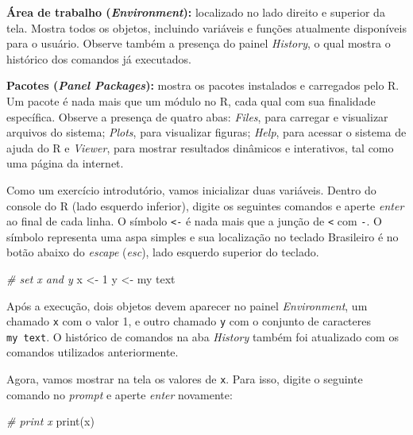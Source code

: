 \documentclass[
  11pt,
]{book}
\newenvironment{Shaded}{\begin{snugshade}}{\end{snugshade}}
\newcommand{\CommentTok}[1]{\textcolor[rgb]{0.37,0.37,0.37}{\textit{#1}}}
\newcommand{\DecValTok}[1]{\textcolor[rgb]{0.06,0.06,0.06}{#1}}
\newcommand{\FunctionTok}[1]{\textcolor[rgb]{0,0,0}{#1}}
\newcommand{\NormalTok}[1]{#1}
\newcommand{\OtherTok}[1]{\textcolor[rgb]{0.37,0.37,0.37}{#1}}
\newcommand{\StringTok}[1]{\textcolor[rgb]{0.5,0.5,0.5}{#1}}
\begin{document}
\textbf{Área de trabalho (\emph{Environment}):} localizado no lado direito e superior da tela. Mostra todos os objetos, incluindo variáveis e funções atualmente disponíveis para o usuário. Observe também a presença do painel \emph{History}, o qual mostra o histórico dos comandos já executados.

\textbf{Pacotes (\emph{Panel Packages}):} mostra os pacotes instalados e carregados pelo R. Um pacote é nada mais que um módulo no R, cada qual com sua finalidade específica. Observe a presença de quatro abas: \emph{Files}, para carregar e visualizar arquivos do sistema; \emph{Plots}, para visualizar figuras; \emph{Help}, para acessar o sistema de ajuda do R e \emph{Viewer}, para mostrar resultados dinâmicos e interativos, tal como uma página da internet.

Como um exercício introdutório, vamos inicializar duas variáveis. Dentro do console do R (lado esquerdo inferior), digite os seguintes comandos e aperte \emph{enter} ao final de cada linha. O símbolo \texttt{\textless{}-} é nada mais que a junção de \texttt{\textless{}} com \texttt{-}. O símbolo \texttt{\textquotesingle{}} representa uma aspa simples e sua localização no teclado Brasileiro é no botão abaixo do \emph{escape} (\emph{esc}), lado esquerdo superior do teclado.

\begin{Shaded}
\begin{Highlighting}[]
\CommentTok{\# set x and y}
\NormalTok{x }\OtherTok{\textless{}{-}} \DecValTok{1}
\NormalTok{y }\OtherTok{\textless{}{-}} \StringTok{\textquotesingle{}my text\textquotesingle{}}
\end{Highlighting}
\end{Shaded}

Após a execução, dois objetos devem aparecer no painel \emph{Environment}, um chamado \texttt{x} com o valor 1, e outro chamado \texttt{y} com o conjunto de caracteres \texttt{\textquotesingle{}my\ text\textquotesingle{}}. O histórico de comandos na aba \emph{History} também foi atualizado com os comandos utilizados anteriormente.

Agora, vamos mostrar na tela os valores de \texttt{x}. Para isso, digite o seguinte comando no \emph{prompt} e aperte \emph{enter} novamente:

\begin{Shaded}
\begin{Highlighting}[]
\CommentTok{\# print x}
\FunctionTok{print}\NormalTok{(x)}
\end{Highlighting}
\end{Shaded}
\end{document}
